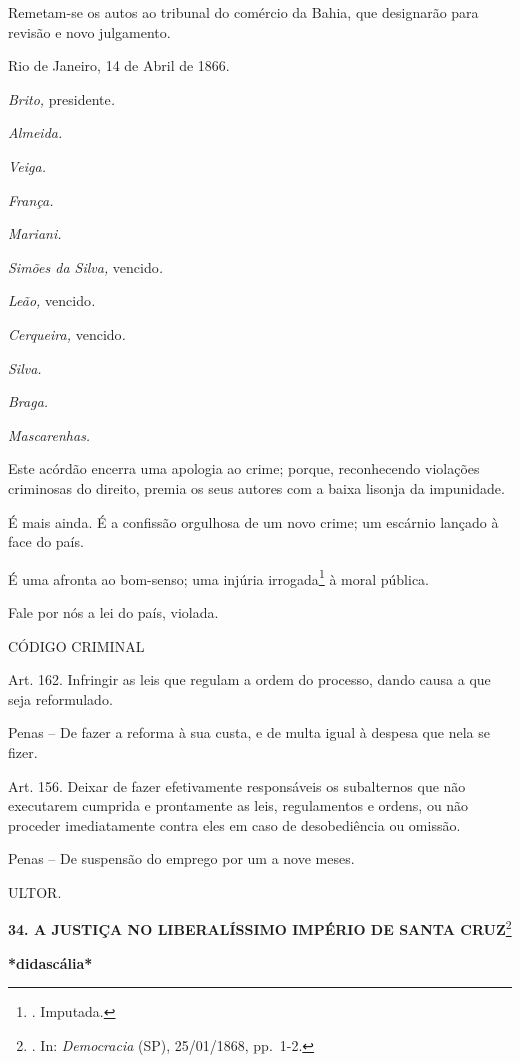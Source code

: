 Remetam-se os autos ao tribunal do comércio da Bahia, que designarão
para revisão e novo julgamento.

Rio de Janeiro, 14 de Abril de 1866.

\emph{Brito,} presidente\emph{.}

\emph{Almeida.}

\emph{Veiga.}

\emph{França.}

\emph{Mariani.}

\emph{Simões da Silva,} vencido\emph{.}

\emph{Leão,} vencido\emph{.}

\emph{Cerqueira,} vencido\emph{.}

\emph{Silva.}

\emph{Braga.}

\emph{Mascarenhas.}

Este acórdão encerra uma apologia ao crime; porque, reconhecendo
violações criminosas do direito, premia os seus autores com a baixa
lisonja da impunidade.

É mais ainda. É a confissão orgulhosa de um novo crime; um escárnio
lançado à face do país.

É uma afronta ao bom-senso; uma injúria irrogada\footnote{. Imputada.} à
moral pública.

Fale por nós a lei do país, violada.

CÓDIGO CRIMINAL

Art. 162. Infringir as leis que regulam a ordem do processo, dando causa
a que seja reformulado.

Penas -- De fazer a reforma à sua custa, e de multa igual à despesa que
nela se fizer.

Art. 156. Deixar de fazer efetivamente responsáveis os subalternos que
não executarem cumprida e prontamente as leis, regulamentos e ordens, ou
não proceder imediatamente contra eles em caso de desobediência ou
omissão.

Penas -- De suspensão do emprego por um a nove meses.

ULTOR.

\textbf{34. A JUSTIÇA NO LIBERALÍSSIMO IMPÉRIO DE SANTA CRUZ}\footnote{.
  In: \emph{Democracia} (SP), 25/01/1868, pp.~1-2.}

\textbf{*didascália*}

